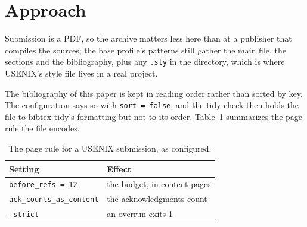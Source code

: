 \section{Approach}

Submission is a PDF, so the archive matters less here than at a publisher
that compiles the sources; the base profile's patterns still gather the
main file, the sections and the bibliography, plus any \texttt{.sty} in the
directory, which is where USENIX's style file lives in a real project.

The bibliography of this paper is kept in reading order rather than sorted
by key. The configuration says so with \texttt{sort = false}, and the tidy
check then holds the file to bibtex-tidy's formatting but not to its order.
Table~\ref{tab:rule} summarizes the page rule the file encodes.

\begin{table}[t]
  \caption{The page rule for a USENIX submission, as configured.}
  \label{tab:rule}
  \centering
  \footnotesize
  \begin{tabular}{ll}
    \toprule
    Setting & Effect \\
    \midrule
    \texttt{before\_refs = 12} & the budget, in content pages \\
    \texttt{ack\_counts\_as\_content} & the acknowledgments count \\
    \texttt{--strict} & an overrun exits 1 \\
    \bottomrule
  \end{tabular}
\end{table}
